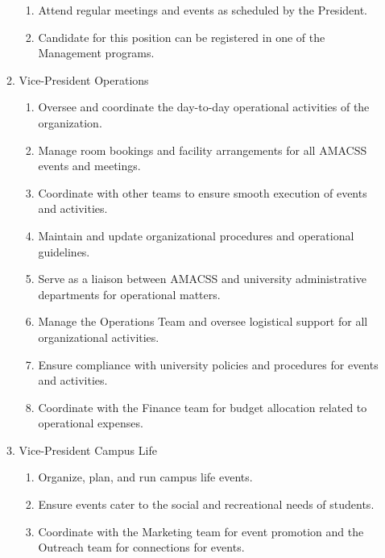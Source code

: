 \documentclass[12pt,a4paper]{article}
\begin{document}
\begin{enumerate}
\begin{enumerate}
\begin{enumerate}
\item Attend regular meetings and events as scheduled by the President.

\item Candidate for this position can be registered in one of the Management programs.
\end{enumerate}

\item Vice-President Operations

\begin{enumerate}
\item Oversee and coordinate the day-to-day operational activities of the organization.

\item Manage room bookings and facility arrangements for all AMACSS events and meetings.

\item Coordinate with other teams to ensure smooth execution of events and activities.

\item Maintain and update organizational procedures and operational guidelines.

\item Serve as a liaison between AMACSS and university administrative departments for operational matters.

\item Manage the Operations Team and oversee logistical support for all organizational activities.

\item Ensure compliance with university policies and procedures for events and activities.

\item Coordinate with the Finance team for budget allocation related to operational expenses.
\end{enumerate}

\item Vice-President Campus Life

\begin{enumerate}
\item Organize, plan, and run campus life events.

\item Ensure events cater to the social and recreational needs of students.

\item Coordinate with the Marketing team for event promotion and the Outreach team for connections for events.


\end{enumerate}
\end{enumerate}
\end{enumerate}
\end{document}
